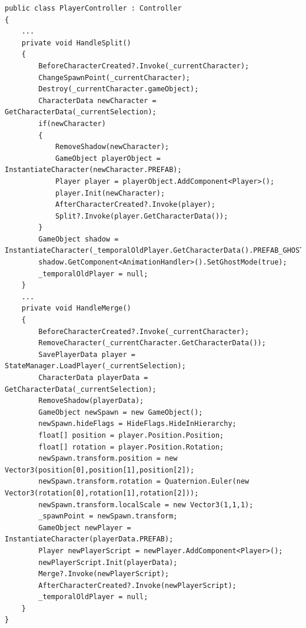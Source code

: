 \begin{lstlisting}[caption={Alte HandleSplit und HandleMerge Methoden}, label={sec:split_merge_old}]
public class PlayerController : Controller
{
    ...
    private void HandleSplit()
    {
        BeforeCharacterCreated?.Invoke(_currentCharacter);
        ChangeSpawnPoint(_currentCharacter);
        Destroy(_currentCharacter.gameObject);
        CharacterData newCharacter = GetCharacterData(_currentSelection);
        if(newCharacter)
        {
            RemoveShadow(newCharacter);
            GameObject playerObject = InstantiateCharacter(newCharacter.PREFAB);
            Player player = playerObject.AddComponent<Player>();
            player.Init(newCharacter);
            AfterCharacterCreated?.Invoke(player);
            Split?.Invoke(player.GetCharacterData());
        }
        GameObject shadow = InstantiateCharacter(_temporalOldPlayer.GetCharacterData().PREFAB_GHOST);
        shadow.GetComponent<AnimationHandler>().SetGhostMode(true);
        _temporalOldPlayer = null;
    }
    ...
    private void HandleMerge()
    {
        BeforeCharacterCreated?.Invoke(_currentCharacter);
        RemoveCharacter(_currentCharacter.GetCharacterData());
        SavePlayerData player = StateManager.LoadPlayer(_currentSelection);
        CharacterData playerData = GetCharacterData(_currentSelection);
        RemoveShadow(playerData);
        GameObject newSpawn = new GameObject();
        newSpawn.hideFlags = HideFlags.HideInHierarchy;
        float[] position = player.Position.Position;
        float[] rotation = player.Position.Rotation;
        newSpawn.transform.position = new Vector3(position[0],position[1],position[2]);
        newSpawn.transform.rotation = Quaternion.Euler(new Vector3(rotation[0],rotation[1],rotation[2]));
        newSpawn.transform.localScale = new Vector3(1,1,1);
        _spawnPoint = newSpawn.transform;
        GameObject newPlayer = InstantiateCharacter(playerData.PREFAB);
        Player newPlayerScript = newPlayer.AddComponent<Player>();
        newPlayerScript.Init(playerData);
        Merge?.Invoke(newPlayerScript);
        AfterCharacterCreated?.Invoke(newPlayerScript);
        _temporalOldPlayer = null;
    }
}
\end{lstlisting}

